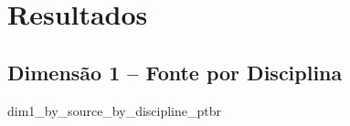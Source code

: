 \section{Resultados}

\lipsum[1-5]

\begin{landscape}
    \subsection{Dimensão 1 -- Fonte por Disciplina}

    {dim1_by_source_by_discipline_ptbr}
\end{landscape}

\lipsum[1-5]
